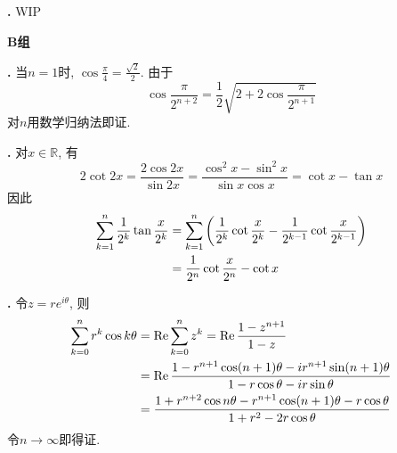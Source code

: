 \par \textbf{\thesolefun .} WIP

\par \textbf{B组}
\par \textbf{\thesolefun .} 当$n=1$时, $\cos\frac{\pi}{4}=\frac{\sqrt{2}}{2}$. 由于
\begin{equation}
    \cos\frac{\pi}{2^{n+2}}=\frac{1}{2}\sqrt{2+2\cos\frac{\pi}{2^{n+1}}}
\end{equation}
对$n$用数学归纳法即证. 

\par \textbf{\thesolefun .} 对$x\in \mathbb{R}$, 有 
\begin{equation}
    2\cot 2x=\frac{2\cos 2x}{\sin 2x} = \frac{\cos^2x-\sin^2x}{\sin x\cos x}= \cot x-\tan x
\end{equation}
因此
\begin{align}
    \sum_{k=1}^n \frac{1}{2^k}\tan \frac{x}{2^k}& = \sum_{k=1}^n \left(\frac{1}{2^k}\cot \frac{x}{2^k}- \frac{1}{2^{k-1}}\cot \frac{x}{2^{k-1}}\right)\notag \\
    &= \frac{1}{2^n}\cot \frac{x}{2^n}-\cot x 
\end{align}


\par \textbf{\thesolefun .} 令$z=re^{i\theta}$, 则
\begin{align}
\sum_{k=0}^n r^k \cos k\theta &= \operatorname{Re}\sum_{k=0}^n z^k=\operatorname{Re} \frac{1-z^{n+1}}{1-z}\notag\\
&=\operatorname{Re} \frac{1-r^{n+1} \cos (n+1)\theta -ir^{n+1}\sin (n+1)\theta}{1-r\cos \theta -ir\sin \theta}\notag\\
&=\frac{1+r^{n+2}\cos n\theta-r^{n+1}\cos (n+1)\theta-r\cos\theta}{1+r^2-2r\cos\theta}
\end{align}
令$n\to \infty$即得证. 